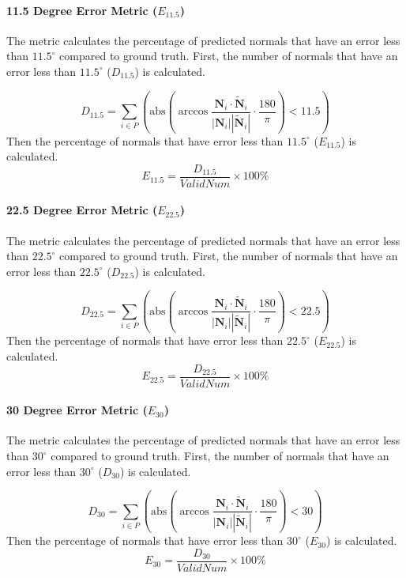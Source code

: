 \paragraph{11.5 Degree Error Metric ($ E_{11.5} $)}
The metric calculates the percentage of predicted normals that have an error less than $ 11.5^\circ $ compared to ground truth. First, the number of normals that have an error less than $ 11.5^\circ $ ($ D_{11.5} $) is calculated.

\[
D_{11.5} = \sum_{i\in P} \left( \text{abs}\left(   \arccos \frac{\textbf{N}_{i}\cdot \tilde{\textbf{N}}_{i}} {| \textbf{N}_{i} |  |\tilde{\textbf{N}}_{i}|  } \cdot  \frac{180}{\pi}   \right) < 11.5 \right)
\]
Then the percentage of normals that have error less than $ 11.5^\circ $ ($ E_{11.5} $) is calculated.
\[ 
E_{11.5} = \frac{D_{11.5}}{ValidNum}\times 100\%
\]

\paragraph{22.5 Degree Error Metric ($ E_{22.5} $)}
The metric calculates the percentage of predicted normals that have an error less than $ 22.5^\circ $ compared to ground truth. First, the number of normals that have an error less than $ 22.5^\circ $ ($ D_{22.5} $) is calculated.

\[
D_{22.5} = \sum_{i\in P} \left( \text{abs}\left(   \arccos \frac{\textbf{N}_{i}\cdot \tilde{\textbf{N}}_{i}} {| \textbf{N}_{i} |  |\tilde{\textbf{N}}_{i}|  } \cdot  \frac{180}{\pi}   \right) < 22.5 \right)
\]
Then the percentage of normals that have error less than $ 22.5^\circ $ ($ E_{22.5} $) is calculated.
\[ 
E_{22.5} = \frac{D_{22.5}}{ValidNum}\times 100\%
\]


\paragraph{30 Degree Error Metric ($ E_{30} $)} 
The metric calculates the percentage of predicted normals that have an error less than $ 30^\circ $ compared to ground truth. First, the number of normals that have an error less than $ 30^\circ $ ($ D_{30} $) is calculated.

\[
D_{30} = \sum_{i\in P} \left( \text{abs}\left(   \arccos \frac{\textbf{N}_{i}\cdot \tilde{\textbf{N}}_{i}} {| \textbf{N}_{i} |  |\tilde{\textbf{N}}_{i}|  } \cdot  \frac{180}{\pi}   \right) < 30 \right)
\]
Then the percentage of normals that have error less than $ 30^\circ $ ($ E_{30} $) is calculated.
\[ 
E_{30} = \frac{D_{30}}{ValidNum}\times 100\%
\]

